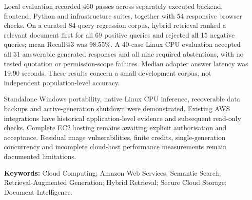 \documentclass[11pt,a4paper,oneside]{report}
\begin{document}
Local evaluation recorded 460 passes across separately executed backend, frontend, Python and infrastructure suites, together with 54 responsive browser checks. On a curated 84-query regression corpus, hybrid retrieval ranked a relevant document first for all 69 positive queries and rejected all 15 negative queries; mean Recall@3 was 98.55\%. A 40-case Linux CPU evaluation accepted all 31 answerable generated responses and all nine required abstentions, with no tested quotation or permission-scope failures. Median adapter answer latency was 19.90 seconds. These results concern a small development corpus, not independent population-level accuracy.

Standalone Windows portability, native Linux CPU inference, recoverable data backups and active-generation shutdown were demonstrated. Existing AWS integrations have historical application-level evidence and subsequent read-only checks. Complete EC2 hosting remains awaiting explicit authorisation and acceptance. Residual image vulnerabilities, finite credits, single-generation concurrency and incomplete cloud-host performance measurements remain documented limitations.

\textbf{Keywords:} Cloud Computing; Amazon Web Services; Semantic Search; Retrieval-Augmented Generation; Hybrid Retrieval; Secure Cloud Storage; Document Intelligence.
\begingroup\setcounter{tocdepth}{0}\tableofcontents\endgroup
\setcounter{tocdepth}{1}\listoffigures\listoftables
\end{document}
